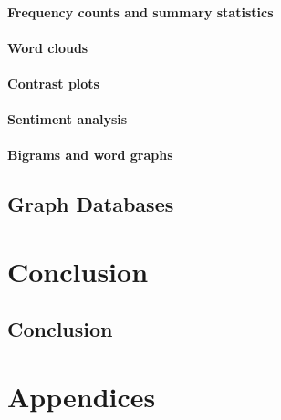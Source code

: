 \documentclass[
]{book}
\begin{document}
\hypertarget{frequency-counts-and-summary-statistics}{%
\subsection{Frequency counts and summary statistics}\label{frequency-counts-and-summary-statistics}}

\hypertarget{word-clouds}{%
\subsection{Word clouds}\label{word-clouds}}

\hypertarget{contrast-plots}{%
\subsection{Contrast plots}\label{contrast-plots}}

\hypertarget{sentiment-analysis}{%
\subsection{Sentiment analysis}\label{sentiment-analysis}}

\hypertarget{bigrams-and-word-graphs}{%
\subsection{Bigrams and word graphs}\label{bigrams-and-word-graphs}}

\hypertarget{graph_dbs}{%
\chapter{Graph Databases}\label{graph_dbs}}

\hypertarget{part-conclusion}{%
\part*{Conclusion}\label{part-conclusion}}

\hypertarget{conclusion}{%
\chapter{Conclusion}\label{conclusion}}

\hypertarget{part-appendices}{%
\part*{Appendices}\label{part-appendices}}

  
\end{document}
